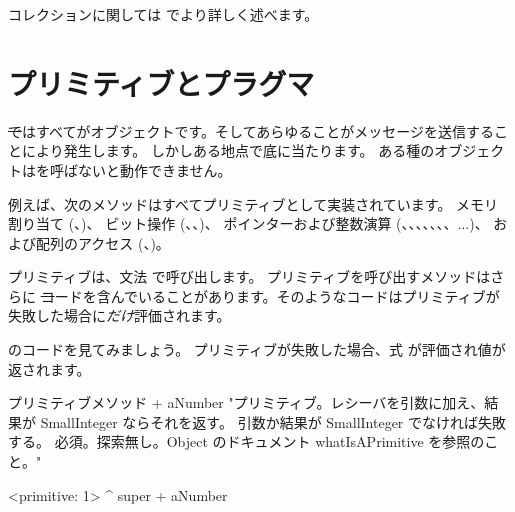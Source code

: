 \documentclass[a4paper,10pt,twoside]{book}
\begin{document}
コレクションに関しては  でより詳しく述べます。

\section{プリミティブとプラグマ}

\st ではすべてがオブジェクトです。そしてあらゆることがメッセージを送信することにより発生します。
しかしある地点で底に当たります。
ある種のオブジェクトはを呼ばないと動作できません。

例えば、次のメソッドはすべてプリミティブとして実装されています。
メモリ割り当て (、)、
ビット操作 (、、)、
ポインターおよび整数演算 (\ct{+}、\ct{-}、\ct{<}、\ct{>}、\ct{*}、\ct{/ }、\ct{=}、\ct{==}...)、
および配列のアクセス (、)。

プリミティブは、文法  で呼び出します。
プリミティブを呼び出すメソッドはさらに \st コードを含んでいることがあります。そのようなコードはプリミティブが失敗した場合に\emph{だけ}評価されます。

のコードを見てみましょう。
プリミティブが失敗した場合、式  が評価され値が返されます。

\begin{method}[primitive]{プリミティブメソッド}
+ aNumber 
  "プリミティブ。レシーバを引数に加え、結果が SmallInteger ならそれを返す。
  引数か結果が SmallInteger でなければ失敗する。
  必須。探索無し。Object のドキュメント whatIsAPrimitive を参照のこと。"

  <primitive: 1>
  ^ super + aNumber
\end{method}

\end{document}
